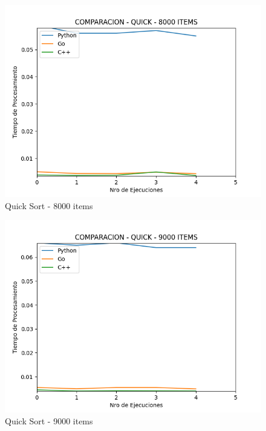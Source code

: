 \documentclass[12pt]{article} %
\begin{document}
    \begin{figure}[H]
    \centering
    \includegraphics[width=\textwidth]{quick_8000}
    \caption{Quick Sort - 8000 items}
    \end{figure}

    \vspace{5mm}
    
    \begin{figure}[H]
    \centering
    \includegraphics[width=\textwidth]{quick_9000}
    \caption{Quick Sort - 9000 items}
    \end{figure}

    \vspace{5mm}
    
\end{document}
